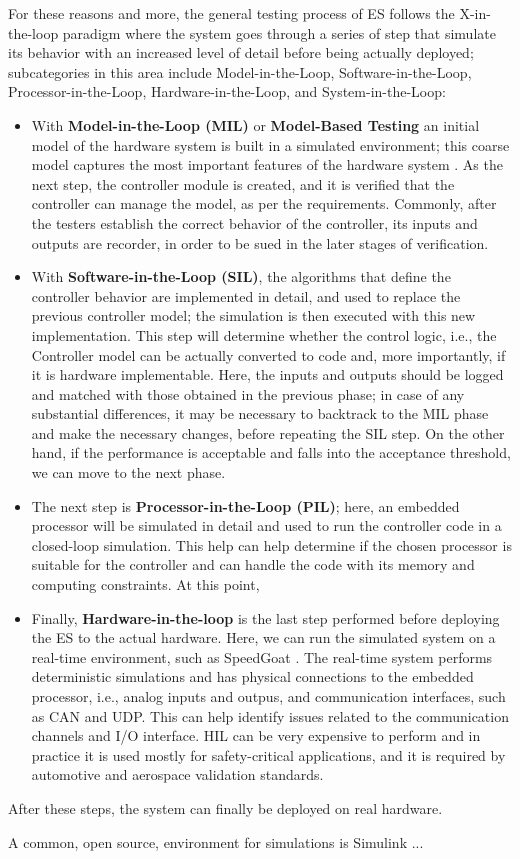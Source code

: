 For these reasons and more, the general testing process of ES follows the X-in-the-loop paradigm \cite{DBLP:journals/software/GarousiFKY18} where the system goes through a series of step that simulate its behavior with an increased level of detail before being actually deployed; subcategories in this area include Model-in-the-Loop, Software-in-the-Loop, Processor-in-the-Loop, Hardware-in-the-Loop, and System-in-the-Loop:
\begin{itemize}
    \item With \textbf{Model-in-the-Loop (MIL)} or \textbf{Model-Based Testing} an initial model of the hardware system is built in a simulated environment; this coarse model captures the most important features of the hardware system \cite{XLoop}. As the next step, the controller module is created, and it is verified that the controller can manage the model, as per the requirements. Commonly, after the testers establish the correct behavior of the controller, its inputs and outputs are recorder, in order to be sued in the later stages of verification.
    \item With \textbf{Software-in-the-Loop (SIL)}, the algorithms that define the controller behavior are implemented in detail, and used to replace the previous controller model; the simulation is then executed with this new implementation. This step will determine whether the control logic, i.e., the Controller model can be actually converted to code and, more importantly, if it is hardware implementable. Here, the inputs and outputs should be logged and matched with those obtained in the previous phase; in case of any substantial differences, it may be necessary to backtrack to the MIL phase and make the necessary changes, before repeating the SIL step. On the other hand, if the performance is acceptable and falls into the acceptance threshold, we can move to the next phase.
    \item The next step is \textbf{Processor-in-the-Loop (PIL)}; here, an embedded processor will be simulated in detail and used to run the controller code in a closed-loop simulation. This help can help determine if the chosen processor is suitable for the controller and can handle the code with its memory and computing constraints. At this point, 
    \item Finally, \textbf{Hardware-in-the-loop} is the last step performed before deploying the ES to the actual hardware. Here, we can run the simulated system on a real-time environment, such as SpeedGoat \cite{SpeedGoat}. The real-time system performs deterministic simulations and has physical connections to the embedded processor, i.e., analog inputs and outpus, and communication interfaces, such as CAN and UDP. This can help identify issues related to the communication channels and I/O interface. HIL can be very expensive to perform and in practice it is used mostly for safety-critical applications, and it is required by automotive and aerospace validation standards. 
\end{itemize}

After these steps, the system can finally be deployed on real hardware.

A common, open source, environment for simulations is Simulink ...